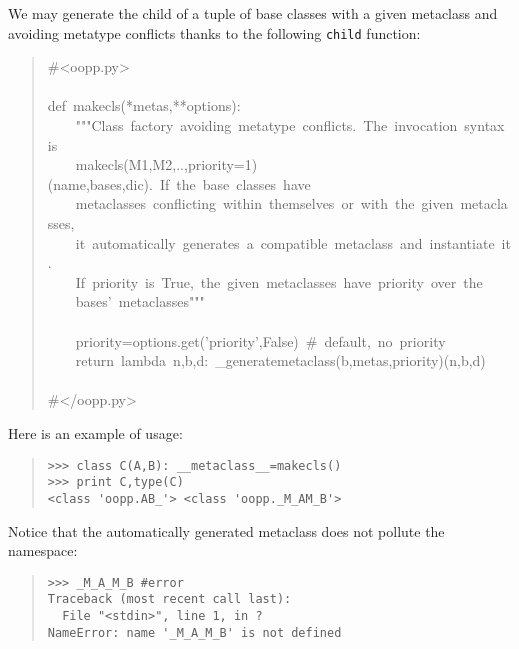 \documentclass[10pt,english]{article}
\begin{document}
We may generate the child of a tuple of base classes with a given metaclass 
and avoiding metatype conflicts thanks to the following \texttt{child} function:
\begin{quote}
\begin{ttfamily}\begin{flushleft}
\mbox{{\#}<oopp.py>}\\
\mbox{}\\
\mbox{def~makecls(*metas,**options):}\\
\mbox{~~~~"""Class~factory~avoiding~metatype~conflicts.~The~invocation~syntax~is}\\
\mbox{~~~~makecls(M1,M2,..,priority=1)(name,bases,dic).~If~the~base~classes~have~}\\
\mbox{~~~~metaclasses~conflicting~within~themselves~or~with~the~given~metaclasses,}\\
\mbox{~~~~it~automatically~generates~a~compatible~metaclass~and~instantiate~it.~}\\
\mbox{~~~~If~priority~is~True,~the~given~metaclasses~have~priority~over~the~}\\
\mbox{~~~~bases'~metaclasses"""}\\
\mbox{}\\
\mbox{~~~~priority=options.get('priority',False)~{\#}~default,~no~priority}\\
\mbox{~~~~return~lambda~n,b,d:~{\_}generatemetaclass(b,metas,priority)(n,b,d)}\\
\mbox{}\\
\mbox{{\#}</oopp.py>}
\end{flushleft}\end{ttfamily}
\end{quote}

Here is an example of usage:
\begin{quote}
\begin{verbatim}>>> class C(A,B): __metaclass__=makecls()
>>> print C,type(C)
<class 'oopp.AB_'> <class 'oopp._M_AM_B'>\end{verbatim}
\end{quote}

Notice that the automatically generated metaclass does not pollute the 
namespace:
\begin{quote}
\begin{verbatim}>>> _M_A_M_B #error
Traceback (most recent call last):
  File "<stdin>", line 1, in ?
NameError: name '_M_A_M_B' is not defined\end{verbatim}
\end{quote}
\end{document}
